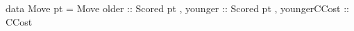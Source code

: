 data Move pt = Move { older      :: Scored pt
                    , younger    :: Scored pt
                    , youngerCCost :: CCost }
